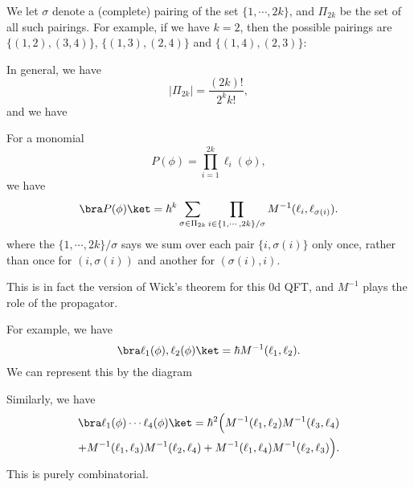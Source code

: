 \documentclass[a4paper]{article}
\begin{document}
We let $\sigma$ denote a (complete) pairing of the set $\{1, \cdots, 2k\}$, and $\Pi_{2k}$ be the set of all such pairings. For example, if we have $k = 2$, then the possible pairings are $\{(1, 2), (3, 4)\}$, $\{(1, 3), (2, 4)\}$ and $\{(1, 4), (2, 3)\}$:
\begin{center}
\end{center}
In general, we have
\[
  |\Pi_{2k}| = \frac{(2k)!}{2^k k!},
\]
and we have
\begin{thm}
  For a monomial
  \[
    P(\phi) = \prod_{i = 1}^{2k} \ell_i(\phi),
  \]
  we have
  \[
    \bra P(\phi)\ket = \hbar^{k}\sum_{\sigma \in \Pi_{2k}} \prod_{i \in \{1, \cdots, 2k\}/\sigma} M^{-1}(\ell_i, \ell_{\sigma(i)}).
  \]
  where the $\{1, \cdots, 2k\}/\sigma$ says we sum over each pair $\{i, \sigma(i)\}$ only once, rather than once for $(i, \sigma(i))$ and another for $(\sigma(i), i)$.
\end{thm}
This is in fact the version of Wick's theorem for this 0d QFT, and $M^{-1}$ plays the role of the propagator.

For example, we have
\[
  \bra \ell_1(\phi), \ell_2(\phi)\ket = \hbar M^{-1} (\ell_1, \ell_2).
\]
We can represent this by the diagram
\begin{center}
\end{center}
Similarly, we have
\begin{multline*}
  \bra \ell_1(\phi) \cdots \ell_4(\phi)\ket = \hbar^2 \Big(M^{-1}(\ell_1, \ell_2) M^{-1}(\ell_3, \ell_4) \\
  + M^{-1}(\ell_1, \ell_3) M^{-1}(\ell_2, \ell_4) + M^{-1}(\ell_1, \ell_4) M^{-1}(\ell_2, \ell_3)\Big).
\end{multline*}
This is purely combinatorial.
\end{document}
